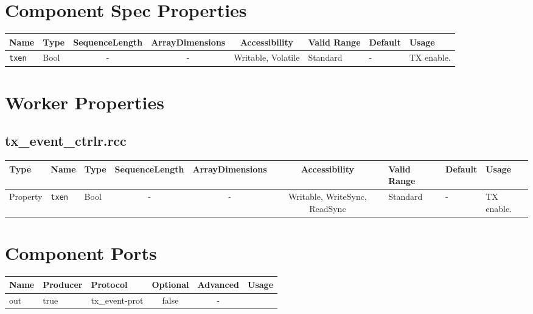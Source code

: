 \documentclass{article}
\def\comp{tx\_event\_ctrlr}
\begin{document}
\begin{landscape}
	\section*{Component Spec Properties}
	\begin{scriptsize}
		\begin{tabular}{|p{3cm}|p{1.5cm}|c|c|c|p{1.5cm}|p{1cm}|p{7.15cm}|}
			\hline
			\rowcolor{blue}
			Name               & Type   & SequenceLength & ArrayDimensions & Accessibility      & Valid Range & Default & Usage                                                                         \\
			\hline
			\verb+txen+        & Bool   & -              & -               & Writable, Volatile & Standard    & -       & TX enable.                                                                    \\
			\hline

		\end{tabular}
	\end{scriptsize}

	\section*{Worker Properties}
	\subsection*{\comp.rcc}
	\begin{scriptsize}
		\begin{tabular}{|p{1.5cm}|p{2.5cm}|p{1cm}|c|c|c|p{2cm}|p{1cm}|p{4cm}|}
			\hline
			\rowcolor{blue}
			Type     & Name                      & Type  & SequenceLength & ArrayDimensions & Accessibility       & Valid Range & Default & Usage                                      \\
			\hline
			Property & \verb+txen+               & Bool  & -              & -               & Writable, WriteSync, ReadSync & Standard    & -       & TX enable.                                 \\
			\hline
		\end{tabular}
	\end{scriptsize}

	\section*{Component Ports}
	\begin{scriptsize}
		\begin{tabular}{|M{2cm}|M{1.5cm}|M{4cm}|c|c|M{11.5cm}|}
			\hline
			\rowcolor{blue}
			Name & Producer & Protocol           & Optional & Advanced & Usage                  \\
			\hline
			out  & true     & tx\_event-prot     & false    & -        & \\
			\hline
		\end{tabular}
	\end{scriptsize}

\end{landscape}
\end{document}
